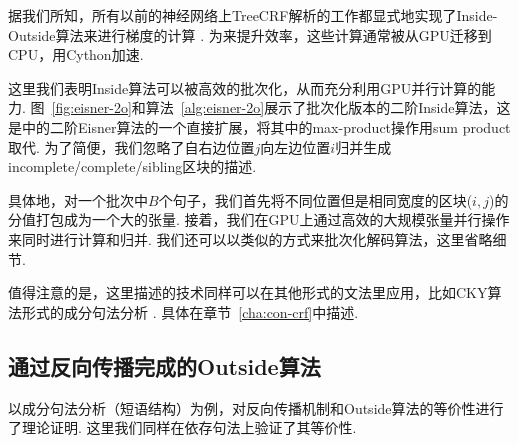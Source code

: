 

据我们所知，所有以前的神经网络上TreeCRF解析的工作都显式地实现了Inside-Outside算法来进行梯度的计算 \citep{zhang-etal-2019-empirical, jiang-etal-2018-supervised}.
为来提升效率，这些计算通常被从GPU迁移到CPU，用Cython加速.

这里我们表明Inside算法可以被高效的批次化，从而充分利用GPU并行计算的能力.
图~\ref{fig:eisner-2o}和算法~\ref{alg:eisner-2o}展示了批次化版本的二阶Inside算法，这是\citet{mcdonald-pereira-2006-online}中的二阶Eisner算法的一个直接扩展，将其中的max-product操作用sum product取代.
为了简便，我们忽略了自右边位置$j$向左边位置$i$归并生成incomplete/complete/sibling区块的描述.

具体地，对一个批次中$B$个句子，我们首先将不同位置但是相同宽度的区块($i, j$)的分值打包成为一个大的张量.
接着，我们在GPU上通过高效的大规模张量并行操作来同时进行计算和归并.
我们还可以以类似的方式来批次化解码算法，这里省略细节.

值得注意的是，这里描述的技术同样可以在其他形式的文法里应用，比如CKY算法形式的成分句法分析 \citep{finkel-etal-2008-efficient,drozdov-etal-2019-unsupervised}.
具体在章节~\ref{cha:con-crf}中描述.

\subsection{通过反向传播完成的Outside算法}

\citet{eisner-2016-inside}以成分句法分析（短语结构）为例，对反向传播机制和Outside算法的等价性进行了理论证明.
这里我们同样在依存句法上验证了其等价性.

